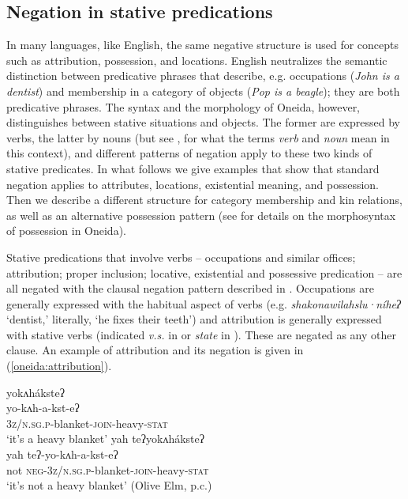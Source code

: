 \documentclass[output=paper,colorlinks,citecolor=brown]{langscibook}
\begin{document}
\subsection{Negation in stative predications}
\label{oneida:sec:statives}

In many languages, like English, the same negative structure is used for concepts such as attribution, possession, and locations. English neutralizes the semantic distinction between predicative phrases that describe, e.g. occupations (\textit{John is a dentist}) and membership in a category of objects (\textit{Pop is a beagle}); they are both predicative phrases. The syntax and the morphology of Oneida, however, distinguishes between stative situations and objects. The former are expressed by verbs, the latter by nouns (but see \citealt{KoenigMichelson2020}, \citeyear{KoenigMichelson2022} for what the terms \textit{verb} and \textit{noun} mean in this context), and different patterns of negation apply to these two kinds of stative predicates. In what follows we give examples that show that standard negation applies to attributes, locations, existential meaning, and possession. Then we describe a different structure for category membership and kin relations, as well as an alternative possession pattern (see \citealt{KoenigMichelson2021} for details on the morphosyntax of possession in Oneida).

Stative predications that involve verbs -- occupations and similar offices; attribution; proper inclusion; locative, existential and possessive predication -- are all negated with the clausal negation pattern described in . Occupations are generally expressed with the habitual aspect of verbs (e.g. \textit{shakonawilahslu·níheʔ} `dentist,' literally, `he fixes their teeth') and attribution is generally expressed with stative verbs (indicated \textit{v.s.} in \citealt{MichelsonDoxtator2002} or \textit{state} in \citealt{AbbottEtAl1996}). These are negated as any other clause. An example of attribution and its negation is given in (\ref{oneida:attribution}). 

\ea\label{oneida:attribution}
    \ea\label{oneida:attribution a}	
        \glll yokʌháksteʔ \\
        yo-kʌh-a-kst-eʔ \\
        \textsc{3z/n.sg.p}-blanket-\textsc{join}-heavy-\textsc{stat} \\
        \glt `it's a heavy blanket'
    \ex\label{oneida:attribution b}
        \glll yah teʔyokʌháksteʔ \\
        yah teʔ-yo-kʌh-a-kst-eʔ \\
        not \textsc{neg-3z/n.sg.p}-blanket-\textsc{join}-heavy-\textsc{stat} \\
        \glt `it's not a heavy blanket' (Olive Elm, p.c.)
    \z
\z 
\end{document}
